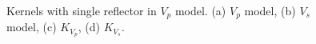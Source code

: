 \begin{figure}[h]
   \\
   \caption{Kernels with single reflector in $V_p$ model. (a) $V_p$ model, (b) $V_s$ model, (c) $K_{V_p}$, (d) $K_{V_s}$.}
   \label{fig:kernel1_vp}
\end{figure}

